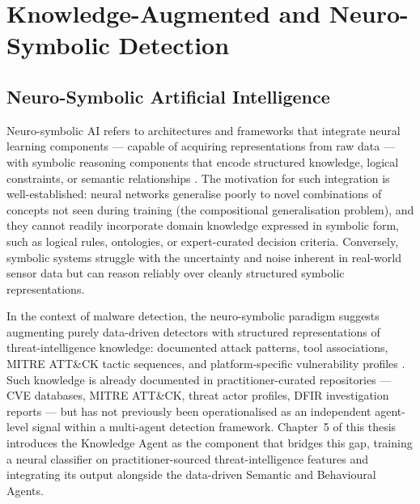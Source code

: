 \section{Knowledge-Augmented and Neuro-Symbolic Detection}
\label{sec:lit_kbs}

\subsection{Neuro-Symbolic Artificial Intelligence}
\label{sec:lit_neurosym}

Neuro-symbolic AI refers to architectures and frameworks that integrate neural learning
components — capable of acquiring representations from raw data — with symbolic reasoning
components that encode structured knowledge, logical constraints, or semantic
relationships \cite{Besold2021neurosymbolicsurvey}.
The motivation for such integration is well-established: neural networks generalise poorly
to novel combinations of concepts not seen during training (the compositional generalisation
problem), and they cannot readily incorporate domain knowledge expressed in symbolic form,
such as logical rules, ontologies, or expert-curated decision criteria.
Conversely, symbolic systems struggle with the uncertainty and noise inherent in real-world
sensor data but can reason reliably over cleanly structured symbolic representations.

In the context of malware detection, the neuro-symbolic paradigm suggests augmenting
purely data-driven detectors with structured representations of threat-intelligence knowledge:
documented attack patterns, tool associations, MITRE ATT\&CK tactic sequences, and
platform-specific vulnerability profiles \cite{Besold2021neurosymbolicsurvey, tian2025llmsurvey}.
Such knowledge is already documented in practitioner-curated repositories — CVE databases,
MITRE ATT\&CK, threat actor profiles, DFIR investigation reports — but has not previously
been operationalised as an independent agent-level signal within a multi-agent detection
framework.
Chapter~5 of this thesis introduces the Knowledge Agent as the component that bridges this
gap, training a neural classifier on practitioner-sourced threat-intelligence features and
integrating its output alongside the data-driven Semantic and Behavioural Agents.

